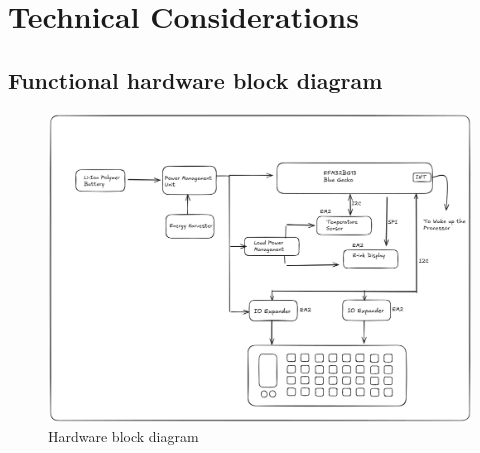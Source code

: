 \documentclass[a4paper,11pt]{article}%
\begin{document}
\section{Technical Considerations}


\subsection{Functional hardware block diagram}



\begin{figure}[H]
    \centering
    \includegraphics[scale=0.32]{figures/blockdiagram.png}
    \caption{Hardware block diagram}
\end{figure}
\vspace{0.2cm}
\end{document}

